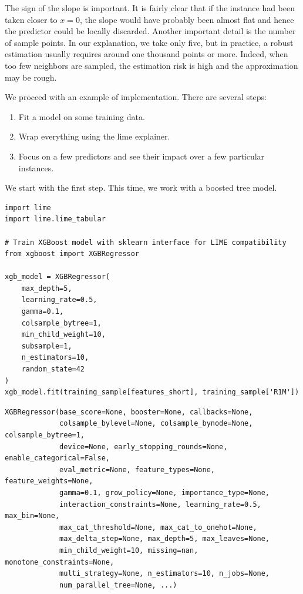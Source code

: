 The sign of the slope is important. It is fairly clear that if the instance had been taken closer to $x=0$, the slope would have probably been almost flat and hence the predictor could be locally discarded. Another important detail is the number of sample points. In our explanation, we take only five, but in practice, a robust estimation usually requires around one thousand points or more. Indeed, when too few neighbors are sampled, the estimation risk is high and the approximation may be rough.

We proceed with an example of implementation. There are several steps:

\begin{enumerate}
\item Fit a model on some training data.
\item Wrap everything using the lime explainer.
\item Focus on a few predictors and see their impact over a few particular instances.
\end{enumerate}

We start with the first step. This time, we work with a boosted tree model.

\begin{verbatim}
import lime
import lime.lime_tabular

# Train XGBoost model with sklearn interface for LIME compatibility
from xgboost import XGBRegressor

xgb_model = XGBRegressor(
    max_depth=5,
    learning_rate=0.5,
    gamma=0.1,
    colsample_bytree=1,
    min_child_weight=10,
    subsample=1,
    n_estimators=10,
    random_state=42
)
xgb_model.fit(training_sample[features_short], training_sample['R1M'])
\end{verbatim}

\begin{verbatim}
XGBRegressor(base_score=None, booster=None, callbacks=None,
             colsample_bylevel=None, colsample_bynode=None, colsample_bytree=1,
             device=None, early_stopping_rounds=None, enable_categorical=False,
             eval_metric=None, feature_types=None, feature_weights=None,
             gamma=0.1, grow_policy=None, importance_type=None,
             interaction_constraints=None, learning_rate=0.5, max_bin=None,
             max_cat_threshold=None, max_cat_to_onehot=None,
             max_delta_step=None, max_depth=5, max_leaves=None,
             min_child_weight=10, missing=nan, monotone_constraints=None,
             multi_strategy=None, n_estimators=10, n_jobs=None,
             num_parallel_tree=None, ...)
\end{verbatim}

